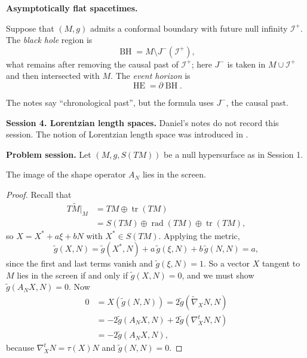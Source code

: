 \medskip\noindent
{\bf Asymptotically flat spacetimes.}

\begin{definition}
\label{definition-solis-black-hole}
Suppose that $(M,g)$ admits a conformal
boundary with future null infinity
$\mathcal{I}^+$. The \emph{black hole}
region is
$$
\operatorname{BH}
=M\setminus J^-(\mathcal{I}^+),
$$
what remains after removing the causal
past of $\mathcal{I}^+$; here $J^-$ is
taken in $M\cup\mathcal{I}^+$ and then
intersected with $M$. The \emph{event
horizon} is
$$
\operatorname{HE}=\partial
\operatorname{BH}.
$$
\end{definition}

\noindent
The notes say ``chronological past'', but
the formula uses $J^-$, the causal past.

\medskip\noindent
{\bf Session 4. Lorentzian length
spaces.} Daniel's notes do not record
this session. The notion of Lorentzian
length space was introduced in
\cite{kunzinger2018lorentzian}.

\medskip\noindent
{\bf Problem session.}
Let $(M,g,S(TM))$ be a null hypersurface
as in Session 1.

\begin{exercise}
\label{exercise-solis-shape-in-screen}
The image of the shape operator $A_N$
lies in the screen.
\end{exercise}

\begin{proof}
Recall that
$$
\begin{aligned}
T\widetilde{M}|_M
&=TM\oplus\operatorname{tr}(TM)\\
&=S(TM)\oplus\operatorname{rad}(TM)
\oplus\operatorname{tr}(TM),
\end{aligned}
$$
so $X=X^*+a\xi+bN$ with
$X^*\in S(TM)$. Applying the metric,
$$
\widetilde{g}(X,N)
=\widetilde{g}(X^*,N)
+a\,\widetilde{g}(\xi,N)
+b\,\widetilde{g}(N,N)=a,
$$
since the first and last terms vanish
and $\widetilde{g}(\xi,N)=1$. So a vector
$X$ tangent to $M$ lies in the screen if
and only if $\widetilde{g}(X,N)=0$, and we
must show $\widetilde{g}(A_NX,N)=0$. Now
$$
\begin{aligned}
0&=X\left(\widetilde{g}(N,N)\right)
=2\widetilde{g}(\widetilde{\nabla}_XN,N)\\
&=-2\widetilde{g}(A_NX,N)
+2\widetilde{g}(\nabla^t_XN,N)\\
&=-2\widetilde{g}(A_NX,N),
\end{aligned}
$$
because $\nabla^t_XN=\tau(X)N$ and
$\widetilde{g}(N,N)=0$.
\end{proof}

